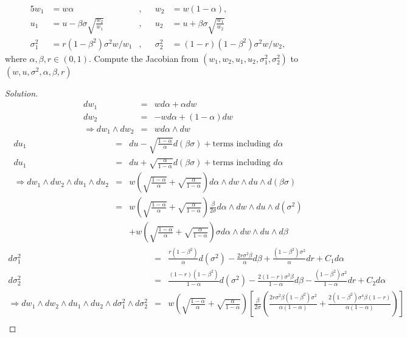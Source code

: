\documentclass[10pt,a4paper]{article}
\begin{document}
\begin{enumerate}
\begin{alignat*}{5}
			w_1		&= w\alpha					&, && w_2 &=w(1-\alpha),\\
			u_1		&= u-\beta\sigma\sqrt{\frac{w_2}{w_1}}	&, && u_2 &=  u+\beta\sigma\sqrt{\frac{w_1}{w_2}}\\
			\sigma_1^2 &= r(1-\beta^2)\sigma^2w/w_1	&, && \sigma_2^2 &= (1-r)(1-\beta^2)\sigma^2w/w_2,
		\end{alignat*}
		where $\alpha,\beta,r\in(0,1)$.
		Compute the Jacobian from $(w_1,w_2,u_1,u_2,\sigma_1^2,\sigma_2^2)$ to $(w,u,\sigma^2,\alpha,\beta,r)$
\begin{proof}[Solution]\let\qed\relax
\begin{eqnarray*}
dw_1 &=& wd\alpha+\alpha dw \\
dw_2 &=& -wd\alpha+(1-\alpha)dw \\
\Longrightarrow dw_1\wedge dw_2 &=& w d\alpha\wedge dw
\end{eqnarray*}
\begin{eqnarray*}
du_1 &=& du-\sqrt{\frac{1-\alpha}{\alpha}}d(\beta\sigma)+\mbox{terms including }d\alpha \\
du_1 &=& du+\sqrt{\frac{\alpha}{1-\alpha}}d(\beta\sigma)+\mbox{terms including }d\alpha \\
\Longrightarrow dw_1\wedge dw_2\wedge du_1\wedge du_2 &=& w\left(\sqrt{\frac{1-\alpha}{\alpha}}+\sqrt{\frac{\alpha}{1-\alpha}}\right)d\alpha\wedge dw\wedge du\wedge d(\beta\sigma) \\
&=& w\left(\sqrt{\frac{1-\alpha}{\alpha}}+\sqrt{\frac{\alpha}{1-\alpha}}\right)\frac{\beta}{2\sigma} d\alpha\wedge dw\wedge du\wedge d(\sigma^2) \\
&&+w\left(\sqrt{\frac{1-\alpha}{\alpha}}+\sqrt{\frac{\alpha}{1-\alpha}}\right)\sigma d\alpha\wedge dw\wedge du\wedge d\beta
\end{eqnarray*}
\begin{eqnarray*}
d\sigma_1^2 &=& \frac{r(1-\beta^2)}{\alpha}d(\sigma^2)-\frac{2r\sigma^2\beta}{\alpha}d\beta+\frac{(1-\beta^2)\sigma^2}{\alpha}dr+C_1d\alpha  \\
d\sigma_2^2 &=& \frac{(1-r)(1-\beta^2)}{1-\alpha}d(\sigma^2)-\frac{2(1-r)\sigma^2\beta}{1-\alpha}d\beta-\frac{(1-\beta^2)\sigma^2}{1-\alpha}dr+C_2d\alpha  \\
\Longrightarrow dw_1\wedge dw_2\wedge du_1\wedge du_2\wedge d\sigma_1^2 \wedge d\sigma_2^2 &=& w\left(\sqrt{\frac{1-\alpha}{\alpha}}+\sqrt{\frac{\alpha}{1-\alpha}}\right)\left[\frac{\beta}{2\sigma}\left(\frac{2r\sigma^2\beta(1-\beta^2)\sigma^2}{\alpha(1-\alpha)}+\frac{2(1-\beta^2)\sigma^4\beta(1-r)}{\alpha(1-\alpha)}\right)\right] \\

\end{eqnarray*}
\end{proof}
\end{enumerate}
\end{document}
